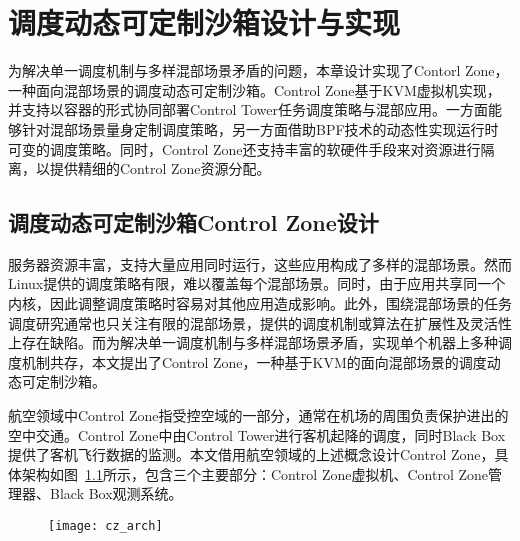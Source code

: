 \chapter{调度动态可定制沙箱设计与实现}\label{chap:control_zone}

为解决单一调度机制与多样混部场景矛盾的问题，本章设计实现了Contorl Zone，一种面向混部场景的调度动态可定制沙箱。Control Zone基于KVM虚拟机实现，并支持以容器的形式协同部署Control Tower任务调度策略与混部应用。一方面能够针对混部场景量身定制调度策略，另一方面借助BPF技术的动态性实现运行时可变的调度策略。同时，Control Zone还支持丰富的软硬件手段来对资源进行隔离，以提供精细的Control Zone资源分配。

\section{调度动态可定制沙箱Control Zone设计}



服务器资源丰富，支持大量应用同时运行，这些应用构成了多样的混部场景。然而Linux提供的调度策略有限，难以覆盖每个混部场景。同时，由于应用共享同一个内核，因此调整调度策略时容易对其他应用造成影响。此外，围绕混部场景的任务调度研究通常也只关注有限的混部场景，提供的调度机制或算法在扩展性及灵活性上存在缺陷。而为解决单一调度机制与多样混部场景矛盾，实现单个机器上多种调度机制共存，本文提出了Control Zone，一种基于KVM的面向混部场景的调度动态可定制沙箱。

航空领域中Control Zone指受控空域的一部分，通常在机场的周围负责保护进出的空中交通。Control Zone中由Control Tower进行客机起降的调度，同时Black Box提供了客机飞行数据的监测。本文借用航空领域的上述概念设计Control Zone，具体架构如图~\ref{fig:cz_arch}所示，包含三个主要部分：Control Zone虚拟机、Control Zone管理器、Black Box观测系统。

\begin{figure}[!htbp]
    \centering
    \texttt{[image: cz\_arch]}
    \label{fig:cz_arch}
\end{figure}

